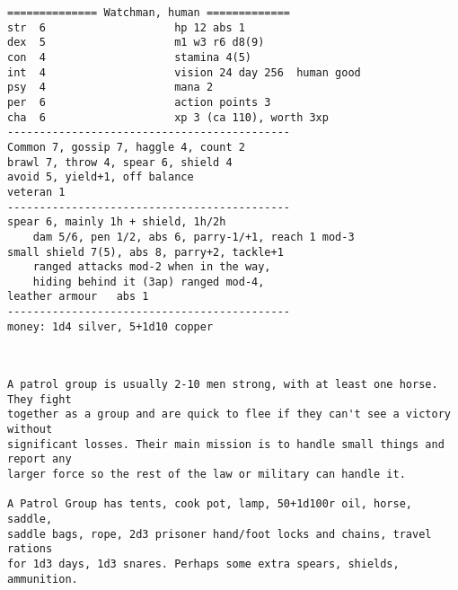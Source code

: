 \goodbreak \begin{samepage} \small \begin{verbatim}
============== Watchman, human =============
str  6                    hp 12 abs 1
dex  5                    m1 w3 r6 d8(9)
con  4                    stamina 4(5)
int  4                    vision 24 day 256  human good
psy  4                    mana 2
per  6                    action points 3
cha  6                    xp 3 (ca 110), worth 3xp
--------------------------------------------
Common 7, gossip 7, haggle 4, count 2
brawl 7, throw 4, spear 6, shield 4
avoid 5, yield+1, off balance
veteran 1
--------------------------------------------
spear 6, mainly 1h + shield, 1h/2h
    dam 5/6, pen 1/2, abs 6, parry-1/+1, reach 1 mod-3
small shield 7(5), abs 8, parry+2, tackle+1
    ranged attacks mod-2 when in the way,
    hiding behind it (3ap) ranged mod-4,
leather armour   abs 1
--------------------------------------------
money: 1d4 silver, 5+1d10 copper
\end{verbatim} \normalsize \end{samepage}

\

\goodbreak \begin{samepage} \small \begin{verbatim}
A patrol group is usually 2-10 men strong, with at least one horse. They fight
together as a group and are quick to flee if they can't see a victory without
significant losses. Their main mission is to handle small things and report any
larger force so the rest of the law or military can handle it.

A Patrol Group has tents, cook pot, lamp, 50+1d100r oil, horse, saddle,
saddle bags, rope, 2d3 prisoner hand/foot locks and chains, travel rations
for 1d3 days, 1d3 snares. Perhaps some extra spears, shields, ammunition.
\end{verbatim} \normalsize \end{samepage}

\

